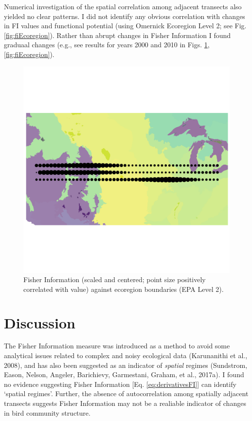 \documentclass[12pt,twoside,openany]{reedthesis}
\begin{document}
Numerical investigation of the spatial correlation among adjacent transects also yielded no clear patterns. I did not identify any obvious correlation with changes in FI values and functional potential (using Omernick Ecoregion Level 2; see Fig. \ref{fig:fiEcoregion}). Rather than abrupt changes in Fisher Information I found graduaal changes (e.g., see results for years 2000 and 2010 in Figs. \ref{fig:fiEcoregion00},\ref{fig:fiEcoregion}).
\begin{figure}
\includegraphics[width=0.85\linewidth]{./chapterFiles/fisherSpatial/figures/figsCalledInDiss/scaledFiInterpolated_year2000_East-West} \caption{Fisher Information (scaled and centered; point size positively correlated with value) against ecoregion boundaries (EPA Level 2).}\label{fig:fiEcoregion00}
\end{figure}
\hypertarget{discussion-1}{%
\section{Discussion}\label{discussion-1}}

The Fisher Information measure was introduced as a method to avoid some analytical issues related to complex and noisy ecological data (Karunanithi et al., 2008), and has also been suggested as an indicator of \emph{spatial} regimes (Sundstrom, Eason, Nelson, Angeler, Barichievy, Garmestani, Graham, et al., 2017a). I found no evidence suggesting Fisher Information {[}Eq. \eqref{eq:derivativesFI}{]} can identify `spatial regimes'. Further, the absence of autocorrelation among spatially adjacent transects suggests Fisher Information may not be a realiable indicator of changes in bird community structure.
\end{document}
